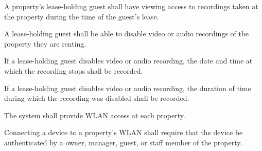 \documentclass[letter,titlepage,oneside,english]{report}
\begin{document}
\begin{fr}
\begin{fr}
  \item
    A property's lease-holding guest shall have viewing access to recordings taken at the property during the time of the guest's lease.
  \item
    A lease-holding guest shall be able to disable video or audio recordings of the property they are renting.
    \begin{fr}
    \item
      If a lease-holding guest disables video or audio recording, the date and time at which the recording stops shall be recorded.
    \item
      If a lease-holding guest disables video or audio recording, the duration of time during which the recording was disabled shall be recorded.
    \end{fr}
  \end{fr}
\item
  The system shall provide WLAN access at each property.
  \begin{fr}
  \item
    Connecting a device to a property's WLAN shall require that the device be authenticated by a owner, manager, guest, or staff member of the property.
  \end{fr}
\end{fr}
\end{document}

